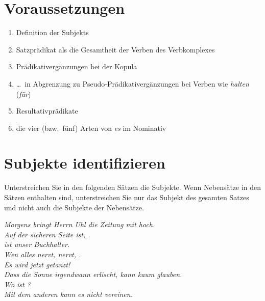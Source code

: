 \section*{Voraussetzungen}

\begin{enumerate}\Lf
  \item Definition der Subjekts
  \item Satzprädikat als die Gesamtheit der Verben des Verbkomplexes
  \item Prädikativergänzungen bei der Kopula
  \item \ldots\ in Abgrenzung zu Pseudo-Prädikativergänzungen bei Verben wie \textit{halten} (\textit{für})
  \item Resultativprädikate
  \item die vier (bzw.\ fünf) Arten von \textit{es} im Nominativ
\end{enumerate}

\section{Subjekte identifizieren}\label{sec:subjekte}

Unterstreichen Sie in den folgenden Sätzen die Subjekte.
Wenn Nebensätze in den Sätzen enthalten sind, unterstreichen Sie nur das Subjekt des gesamten Satzes und nicht auch die Subjekte der Nebensätze.

\begin{exe}
  \ex \textit{Morgens bringt  Herrn Uhl die Zeitung mit hoch.} \\
  \Viertelzeile
  \ex \textit{Auf der sicheren Seite ist, .} \\
  \Viertelzeile
  \ex \textit{ ist unser Buchhalter.} \\
  \Viertelzeile
  \ex \textit{Wen alles nervt, nervt, .} \\
  \Viertelzeile
  \ex \textit{Es wird jetzt getanzt!} \\
  \Viertelzeile
  \ex \textit{Dass die Sonne irgendwann erlischt, kann  kaum glauben.} \\
  \Viertelzeile
  \ex \textit{Wo ist ?} \\
  \Viertelzeile
  \ex \textit{Mit dem anderen kann  es nicht vereinen.} \\
  \Viertelzeile
\end{exe}

